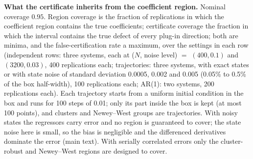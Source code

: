 \begin{table}[!tbp]
\caption{\textbf{What the certificate inherits from the coefficient region.} Nominal coverage $0.95$. Region coverage is the fraction of replications in which the coefficient region contains the true coefficients; certificate coverage the fraction in which the interval contains the true defect of every plug-in direction; both are minima, and the false-certification rate a maximum, over the settings in each row (independent rows: three systems, each at ($N$, noise level) $=$ $(400, 0.1)$ and $(3200, 0.03)$, 400 replications each; trajectories: three systems, with exact states or with state noise of standard deviation 0.0005, 0.002 and 0.005 (0.05\% to 0.5\% of the box half-width), 100 replications each; AR(1): two systems, 200 replications each). Each trajectory starts from a uniform initial condition in the box and runs for 100 steps of 0.01; only its part inside the box is kept (at most 100 points), and clusters and Newey--West groups are trajectories. With noisy states the regressors carry error and no region is guaranteed to cover; the state noise here is small, so the bias is negligible and the differenced derivatives dominate the error (main text). With serially correlated errors only the cluster-robust and Newey--West regions are designed to cover.}
\label{tab:robustness}
\end{table}
